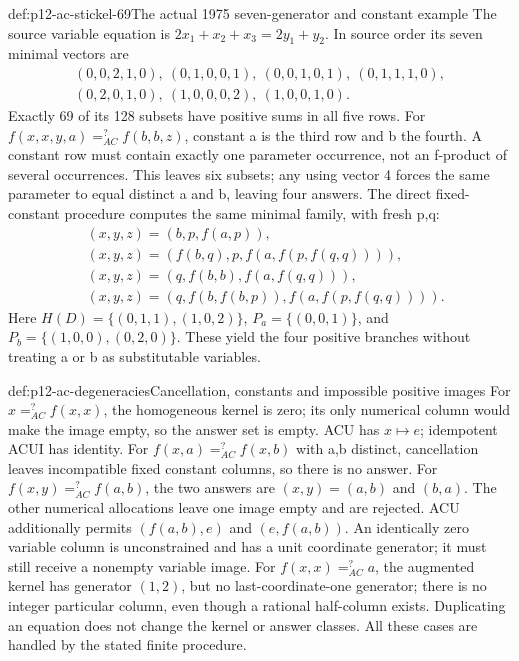 \begin{hbexample}{def:p12-ac-stickel-69}{The actual 1975 seven-generator and constant example}
The source variable equation is
\(2x_1+x_2+x_3=2y_1+y_2\). In source order its seven minimal
vectors are
\[
\begin{gathered}
(0,0,2,1,0),\ (0,1,0,0,1),\ (0,0,1,0,1),\ (0,1,1,1,0),\\
(0,2,0,1,0),\ (1,0,0,0,2),\ (1,0,0,1,0).
\end{gathered}
\]
Exactly 69 of its 128 subsets have positive sums in all five rows.
For \(f(x,x,y,a)=^{?}_{AC}f(b,b,z)\), constant a is the
third row and b the fourth. A constant row must contain exactly
one parameter occurrence, not an f-product of several occurrences.
This leaves six subsets; any using vector 4 forces the same parameter
to equal distinct a and b, leaving four answers. The direct fixed-
constant procedure computes the same minimal family, with fresh p,q:
\[
\begin{aligned}
 &(x,y,z)=(b,p,f(a,p)),\\
 &(x,y,z)=(f(b,q),p,f(a,f(p,f(q,q)))),\\
 &(x,y,z)=(q,f(b,b),f(a,f(q,q))),\\
 &(x,y,z)=(q,f(b,f(b,p)),f(a,f(p,f(q,q)))).
\end{aligned}
\]
Here \(H(D)=\{(0,1,1),(1,0,2)\}\),
\(P_a=\{(0,0,1)\}\), and
\(P_b=\{(1,0,0),(0,2,0)\}\). These yield the four positive
branches without treating a or b as substitutable variables.
\cite[pp.~73--75]{Stickel1975AC}
\end{hbexample}

\begin{hbexample}{def:p12-ac-degeneracies}{Cancellation, constants and impossible positive images}
For \(x=^{?}_{AC}f(x,x)\), the homogeneous kernel is zero;
its only numerical column would make the image empty, so the answer
set is empty. ACU has \(x\mapsto e\); idempotent ACUI has identity.
For \(f(x,a)=^{?}_{AC}f(x,b)\) with a,b distinct, cancellation
leaves incompatible fixed constant columns, so there is no answer.
For \(f(x,y)=^{?}_{AC}f(a,b)\), the two answers are
\((x,y)=(a,b)\) and \((b,a)\). The other numerical allocations
leave one image empty and are rejected. ACU additionally permits
\((f(a,b),e)\) and \((e,f(a,b))\).
An identically zero variable column is unconstrained and has a unit
coordinate generator; it must still receive a nonempty variable image.
For \(f(x,x)=^{?}_{AC}a\), the augmented kernel has generator
\((1,2)\), but no last-coordinate-one generator; there is no
integer particular column, even though a rational half-column exists.
Duplicating an equation does not change the kernel or answer classes.
All these cases are handled by the stated finite procedure.
\end{hbexample}


